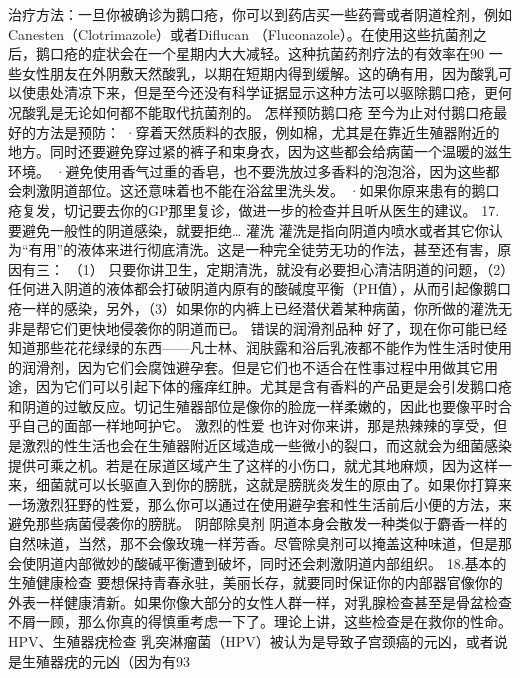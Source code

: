 \documentclass[12pt,UTF8]{ctexbook}
\begin{document}
治疗方法：一旦你被确诊为鹅口疮，你可以到药店买一些药膏或者阴道栓剂，例如Canesten（Clotrimazole）或者Diflucan （Fluconazole）。在使用这些抗菌剂之后，鹅口疮的症状会在一个星期内大大减轻。这种抗菌药剂疗法的有效率在90%
一些女性朋友在外阴敷天然酸乳，以期在短期内得到缓解。这的确有用，因为酸乳可以使患处清凉下来，但是至今还没有科学证据显示这种方法可以驱除鹅口疮，更何况酸乳是无论如何都不能取代抗菌剂的。
怎样预防鹅口疮
至今为止对付鹅口疮最好的方法是预防：
·穿着天然质料的衣服，例如棉，尤其是在靠近生殖器附近的地方。同时还要避免穿过紧的裤子和束身衣，因为这些都会给病菌一个温暖的滋生环境。
·避免使用香气过重的香皂，也不要洗放过多香料的泡泡浴，因为这些都会刺激阴道部位。这还意味着也不能在浴盆里洗头发。
·如果你原来患有的鹅口疮复发，切记要去你的GP那里复诊，做进一步的检查并且听从医生的建议。
17.要避免一般性的阴道感染，就要拒绝…
灌洗
灌洗是指向阴道内喷水或者其它你认为“有用”的液体来进行彻底清洗。这是一种完全徒劳无功的作法，甚至还有害，原因有三：
（1） 只要你讲卫生，定期清洗，就没有必要担心清洁阴道的问题，（2）任何进入阴道的液体都会打破阴道内原有的酸碱度平衡（PH值），从而引起像鹅口疮一样的感染，另外，（3）如果你的内裤上已经潜伏着某种病菌，你所做的灌洗无非是帮它们更快地侵袭你的阴道而已。
错误的润滑剂品种
好了，现在你可能已经知道那些花花绿绿的东西——凡士林、润肤露和浴后乳液都不能作为性生活时使用的润滑剂，因为它们会腐蚀避孕套。但是它们也不适合在性事过程中用做其它用途，因为它们可以引起下体的瘙痒红肿。尤其是含有香料的产品更是会引发鹅口疮和阴道的过敏反应。切记生殖器部位是像你的脸庞一样柔嫩的，因此也要像平时合乎自己的面部一样地呵护它。
激烈的性爱
也许对你来讲，那是热辣辣的享受，但是激烈的性生活也会在生殖器附近区域造成一些微小的裂口，而这就会为细菌感染提供可乘之机。若是在尿道区域产生了这样的小伤口，就尤其地麻烦，因为这样一来，细菌就可以长驱直入到你的膀胱，这就是膀胱炎发生的原由了。如果你打算来一场激烈狂野的性爱，那么你可以通过在使用避孕套和性生活前后小便的方法，来避免那些病菌侵袭你的膀胱。
阴部除臭剂
阴道本身会散发一种类似于麝香一样的自然味道，当然，那不会像玫瑰一样芳香。尽管除臭剂可以掩盖这种味道，但是那会使阴道内部微妙的酸碱平衡遭到破坏，同时还会刺激阴道内部组织。
18.基本的生殖健康检查
要想保持青春永驻，美丽长存，就要同时保证你的内部器官像你的外表一样健康清新。如果你像大部分的女性人群一样，对乳腺检查甚至是骨盆检查不屑一顾，那么你真的得慎重考虑一下了。理论上讲，这些检查是在救你的性命。
HPV、生殖器疣检查
乳突淋瘤菌（HPV）被认为是导致子宫颈癌的元凶，或者说是生殖器疣的元凶（因为有93%
\end{document}
